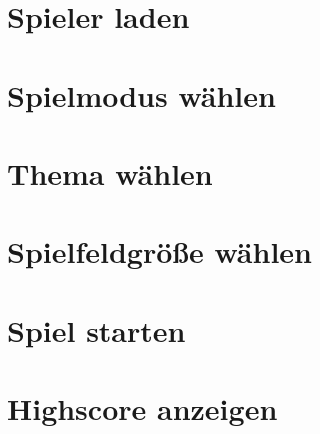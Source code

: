 \clearpage
\section{Spieler laden}

\clearpage
\section{Spielmodus wählen}

\clearpage
\section{Thema wählen} 

\clearpage
\section{Spielfeldgröße wählen}

\clearpage
\section{Spiel starten}

\clearpage
\section{Highscore anzeigen}
